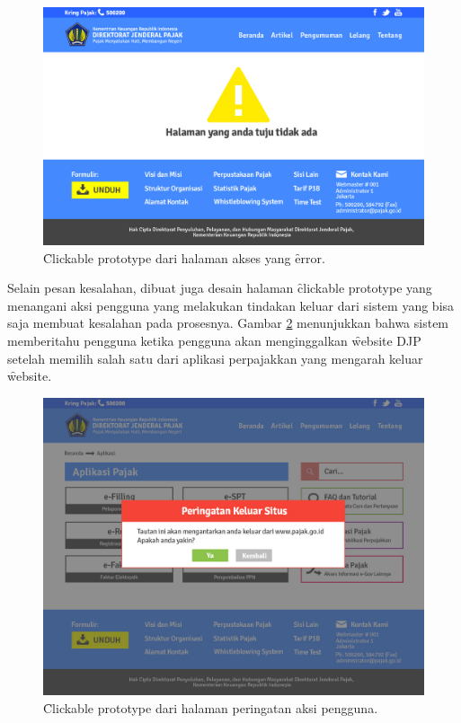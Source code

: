\begin{enumerate}
\begin{figure}
			\includegraphics[width=\textwidth]
			{pics/error.jpg}
			\caption{\f{Clickable prototype} dari halaman akses yang \f{error}.}
			\label{fig:error}
		\end{figure}
	Selain pesan kesalahan, dibuat juga desain halaman \f{clickable prototype} yang menangani aksi pengguna yang melakukan tindakan keluar dari sistem yang bisa saja membuat kesalahan pada prosesnya. Gambar \ref{fig:peringatan} menunjukkan bahwa sistem memberitahu pengguna ketika pengguna akan menginggalkan \f{website} DJP setelah memilih salah satu dari aplikasi perpajakkan yang mengarah keluar \f{website}.
		\begin{figure}
			\centering
			\includegraphics[width=\textwidth]
			{pics/peringatan.jpg}
			\caption{\f{Clickable prototype} dari halaman peringatan aksi pengguna.}
			\label{fig:peringatan}

\end{figure}
\end{enumerate}
